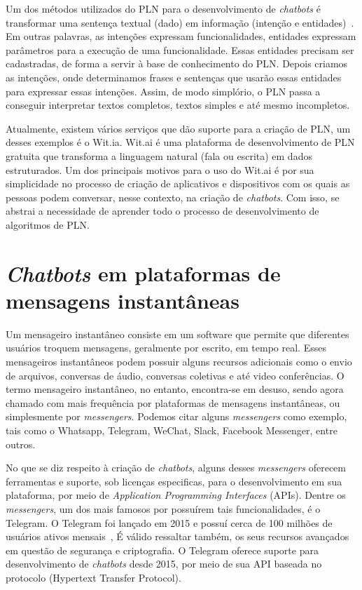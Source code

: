 Um dos métodos utilizados do PLN para o desenvolvimento de \textit{chatbots} é transformar uma sentença textual (dado) em informação (intenção e entidades)~\cite{Anatomy}. Em outras palavras, as intenções expressam funcionalidades, entidades expressam parâmetros para a execução de uma funcionalidade. Essas entidades precisam ser cadastradas, de forma a servir à base de conhecimento do PLN. Depois criamos as intenções, onde determinamos frases e sentenças que usarão essas entidades para expressar essas intenções. Assim, de modo simplório, o PLN passa a conseguir interpretar textos completos, textos simples e até mesmo incompletos.

Atualmente, existem vários serviços que dão suporte para a criação de PLN, um desses exemplos é o Wit.ia. Wit.ai é uma plataforma de desenvolvimento de PLN gratuita que transforma a linguagem natural (fala ou escrita) em dados estruturados. Um dos principais motivos para o uso do Wit.ai é por sua simplicidade no processo de criação de aplicativos e dispositivos com os quais as pessoas podem conversar, nesse contexto, na criação de \textit{chatbots}. Com isso, se abstrai a necessidade de aprender todo o processo de desenvolvimento de algoritmos de PLN.


\section{\textit{Chatbots} em plataformas de mensagens instantâneas}\label{cap:02:sec:03:sub:chatbotsmessenger}

Um mensageiro instantâneo consiste em um software que permite que diferentes usuários troquem mensagens, geralmente por escrito, em tempo real. 
Esses mensageiros instantâneos podem possuir alguns recursos adicionais como o envio de arquivos, conversas de áudio, conversas coletivas e até video conferências.
O termo mensageiro instantâneo, no entanto, encontra-se em desuso, sendo agora chamado com mais frequência por plataformas de mensagens instantâneas, ou simplesmente por \textit{messengers}. Podemos citar alguns \textit{messengers} como exemplo, tais como o Whatsapp, Telegram, WeChat, Slack, Facebook Messenger, entre outros.

No que se diz respeito à criação de \textit{chatbots}, alguns desses \textit{messengers} oferecem ferramentas e suporte, sob licenças especificas, para o desenvolvimento em sua plataforma, por meio de \textit{Application Programming Interfaces} (APIs).
Dentre os \textit{messengers}, um dos mais famosos por possuírem tais funcionalidades, é o Telegram.
O Telegram foi lançado em 2015 e possuí cerca de 100 milhões de usuários ativos mensais~\cite{IMaster}, 
É válido ressaltar também, os seus recursos avançados em questão de segurança e criptografia.
O Telegram oferece suporte para desenvolvimento de \textit{chatbots} desde 2015, por meio de sua API baseada no protocolo  (Hypertext Transfer Protocol).



